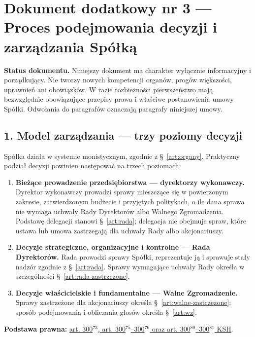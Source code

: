 \documentclass[12pt,a4paper]{report}
\newcounter{paragraf}
\begin{document}
\clearpage
\section*{Dokument dodatkowy nr 3 — Proces podejmowania decyzji i zarządzania Spółką}
\label{annex:proces-decyzyjny}

\textbf{Status dokumentu.} Niniejszy dokument ma charakter wyłącznie informacyjny i porządkujący. Nie tworzy nowych kompetencji organów, progów większości, uprawnień ani obowiązków. W razie rozbieżności pierwszeństwo mają bezwzględnie obowiązujące przepisy prawa i właściwe postanowienia umowy Spółki. Odwołania do paragrafów oznaczają paragrafy niniejszej umowy.

\subsection*{1. Model zarządzania — trzy poziomy decyzji}

Spółka działa w systemie monistycznym, zgodnie z §~\ref{art:organy}. Praktyczny podział decyzji powinien następować na trzech poziomach:
\begin{enumerate}
  \item \textbf{Bieżące prowadzenie przedsiębiorstwa — dyrektorzy wykonawczy.} Dyrektor wykonawczy prowadzi sprawy mieszczące się w powierzonym zakresie, zatwierdzonym budżecie i przyjętych politykach, o ile dana sprawa nie wymaga uchwały Rady Dyrektorów albo Walnego Zgromadzenia. Podstawę delegacji stanowi §~\ref{art:rada}; delegacja nie obejmuje spraw, które ustawa lub umowa zastrzegają dla uchwały Rady albo akcjonariuszy.
  \item \textbf{Decyzje strategiczne, organizacyjne i kontrolne — Rada Dyrektorów.} Rada prowadzi sprawy Spółki, reprezentuje ją i sprawuje stały nadzór zgodnie z §~\ref{art:rada}. Sprawy wymagające uchwały Rady określa w szczególności §~\ref{art:rada-zastrzezone}.
  \item \textbf{Decyzje właścicielskie i fundamentalne — Walne Zgromadzenie.} Sprawy zastrzeżone dla akcjonariuszy określa §~\ref{art:walne-zastrzezone}; sposób podejmowania i obliczania głosów określa §~\ref{art:wz}.
\end{enumerate}

\textbf{Podstawa prawna:} \href{https://eli.gov.pl/api/acts/DU/2024/18/text.html}{art. 300$^{73}$, art. 300$^{75}$--300$^{76}$ oraz art. 300$^{80}$--300$^{81}$ KSH}.
\end{document}
